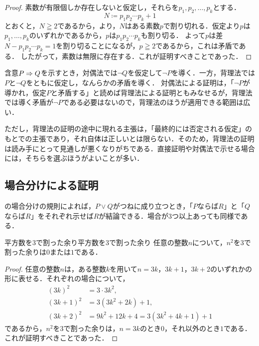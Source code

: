\begin{tleftbar}
  \begin{proof}
    素数が有限個しか存在しないと仮定し，それらを$p_1, p_2, \dots, p_k$とする．
    \[
      N \coloneqq p_1 p_2 \dotsm p_k + 1
    \]
    とおくと，$N \geqq 2$であるから，より，$N$はある素数$p$で割り切れる．仮定より$p$は$p_1, \dots, p_k$のいずれかであるから，$p$は$p_1 p_2 \dotsm p_k$も割り切る．
    よって$p$は差$N - p_1 p_2 \dotsm p_k = 1$を割り切ることになるが，$p \geqq 2$であるから，これは矛盾である．
    したがって，素数は無限に存在する．これが証明すべきことであった．
  \end{proof}
\end{tleftbar}

\begin{remark}[背理法と対偶法の違い]
  含意$P \mathrel{\Rightarrow} Q$を示すとき，対偶法では$\lnot Q$を仮定して$\lnot P$を導く．一方，背理法では$P$と$\lnot Q$をともに仮定し，なんらかの矛盾を導く．
  対偶法による証明は，「$\lnot P$が導かれ，仮定$P$と矛盾する」と読めば背理法による証明ともみなせるが，背理法では導く矛盾が$\lnot P$である必要はないので，背理法のほうが適用できる範囲は広い．

  ただし，背理法の証明の途中に現れる主張は，「最終的には否定される仮定」のもとでの主張であり，それ自体は正しいとは限らない．そのため，背理法の証明は読み手にとって見通しが悪くなりがちである．直接証明や対偶法で示せる場合には，そちらを選ぶほうがよいことが多い．
\end{remark}

\subsection{場合分けによる証明}

の場合分けの規則によれば，$P \lor Q$がつねに成り立つとき，「$P$ならば$R$」と「$Q$ならば$R$」をそれぞれ示せば$R$が結論できる．場合が$3$つ以上あっても同様である．

\begin{prop}{平方数を$3$で割った余り}{平方数を3で割った余り}
  任意の整数$n$について，$n^2$を$3$で割った余りは$0$または$1$である．
\end{prop}

\begin{tleftbar}
  \begin{proof}
    任意の整数$n$は，ある整数$k$を用いて$n = 3k$，$3k + 1$，$3k + 2$のいずれかの形に表せる．それぞれの場合について，
    \begin{align*}
      (3k)^2     & = 3 \cdot 3k^2,                \\
      (3k + 1)^2 & = 3(3k^2 + 2k) + 1,            \\
      (3k + 2)^2 & = 9k^2 + 12k + 4 = 3(3k^2 + 4k + 1) + 1
    \end{align*}
    であるから，$n^2$を$3$で割った余りは，$n = 3k$のとき$0$，それ以外のとき$1$である．これが証明すべきことであった．
  \end{proof}
\end{tleftbar}

